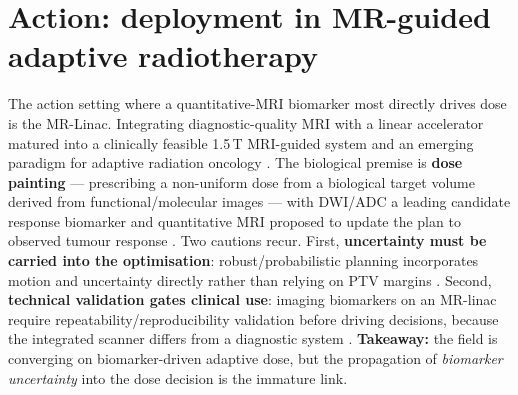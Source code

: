 \documentclass[review,number]{elsarticle}
\begin{document}
\section{Action: deployment in MR-guided adaptive radiotherapy}
\label{sec:action}

The action setting where a quantitative-MRI biomarker most directly drives dose is the
MR-Linac. Integrating diagnostic-quality MRI with a linear accelerator
\cite{lagendijk2008,raaymakers2009} matured into a clinically feasible 1.5\,T MRI-guided
system \cite{raaymakers2017,lagendijk2014} and an emerging paradigm for adaptive
radiation oncology \cite{otazo2021,hall2022}. The biological premise is \textbf{dose
painting} --- prescribing a non-uniform dose from a biological target volume derived from
functional/molecular images
\cite{ling2000,bentzen2005,bentzen2011}%
{} --- with DWI/ADC a leading candidate response biomarker \cite{leibfarth2018} and
quantitative MRI proposed to update the plan to observed tumour response
\cite{vanhoudt2021,otazo2021}. Two cautions recur. First, \textbf{uncertainty must be
carried into the optimisation}: robust/probabilistic planning incorporates motion and
uncertainty directly rather than relying on PTV margins \cite{unkelbach2018}. Second,
\textbf{technical validation gates clinical use}: imaging biomarkers on an MR-linac
require repeatability/reproducibility validation before driving decisions, because the
integrated scanner differs from a diagnostic system
\cite{vanhoudt2021qib}.%
{} \textbf{Takeaway:} the field is converging on biomarker-driven adaptive dose, but the
propagation of \emph{biomarker uncertainty} into the dose decision is the immature link.
\end{document}
